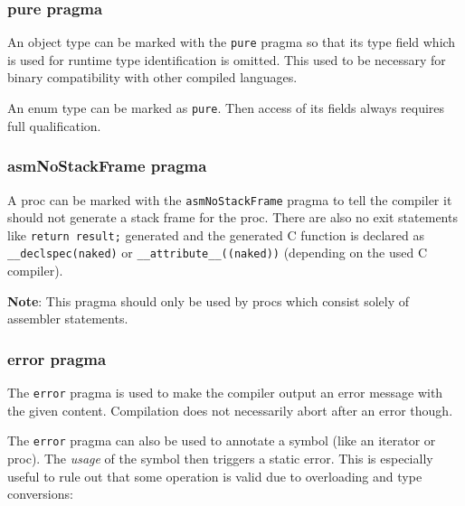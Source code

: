 \begin{verbatim}
\end{verbatim}

\hypertarget{pure-pragma}{%
\subsubsection{pure pragma}\label{pure-pragma}}

An object type can be marked with the \texttt{pure} pragma so that its
type field which is used for runtime type identification is omitted.
This used to be necessary for binary compatibility with other compiled
languages.

An enum type can be marked as \texttt{pure}. Then access of its fields
always requires full qualification.

\hypertarget{asmnostackframe-pragma}{%
\subsubsection{asmNoStackFrame pragma}\label{asmnostackframe-pragma}}

A proc can be marked with the \texttt{asmNoStackFrame} pragma to tell
the compiler it should not generate a stack frame for the proc. There
are also no exit statements like \texttt{return\ result;} generated and
the generated C function is declared as \texttt{\_\_declspec(naked)} or
\texttt{\_\_attribute\_\_((naked))} (depending on the used C compiler).

\textbf{Note}: This pragma should only be used by procs which consist
solely of assembler statements.

\hypertarget{error-pragma}{%
\subsubsection{error pragma}\label{error-pragma}}

The \texttt{error} pragma is used to make the compiler output an error
message with the given content. Compilation does not necessarily abort
after an error though.

The \texttt{error} pragma can also be used to annotate a symbol (like an
iterator or proc). The \emph{usage} of the symbol then triggers a static
error. This is especially useful to rule out that some operation is
valid due to overloading and type conversions:

\begin{verbatim}
\end{verbatim}

